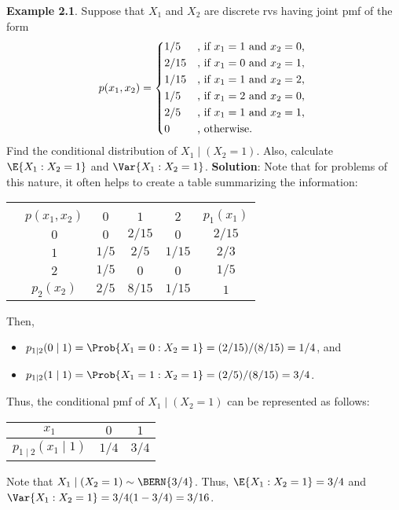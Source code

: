 \begin{Example}
    \textbf{Example 2.1}. Suppose that $ X_1 $ and $ X_2 $ are discrete rvs having joint pmf of the form
    \[ p(x_1,x_2)=\begin{cases*}
            1/5  & , if $ x_1=1 $ and $ x_2=0 $, \\
            2/15 & , if $ x_1=0 $ and $ x_2=1 $, \\
            1/15 & , if $ x_1=1 $ and $ x_2=2 $, \\
            1/5  & , if $ x_1=2 $ and $ x_2=0 $, \\
            2/5  & , if $ x_1=1 $ and $ x_2=1 $, \\
            0    & , otherwise.
        \end{cases*} \]
    Find the conditional distribution of $ X_1\mid (X_2=1) $. Also, calculate $ \E{X_1\given X_2=1} $ and
    $ \Var{X_1\given X_2=1} $.
    \tcblower{}
    \textbf{Solution}: Note that for problems of this nature, it often helps to create a table summarizing the information:
    \begin{center}
        \begin{NiceTabular}{cc|ccc|c}
                                 &                                                 \\%
                                 & $ p(x_1,x_2) $       & $ 0 $   & $ 1 $    & $ 2 $    & $ p_1(x_1) $ \\
             & $ 0 $                & $ 0 $   & $ 2/15 $ & $ 0 $    & $ 2/15 $     \\%
                                 & $ 1 $                & $ 1/5 $ & $ 2/5 $  & $ 1/15 $ & $ 2/3 $      \\
                                 & $ 2 $                & $ 1/5 $ & $ 0 $    & $ 0 $    & $ 1/5 $      \\
                                 & $ p_2(x_2) $         & $ 2/5 $ & $ 8/15 $ & $ 1/15 $ & $ 1 $
        \end{NiceTabular}
    \end{center}
    Then,
    \begin{itemize}
        \item $ p_{1\mid 2}(0\mid 1)=\Prob{X_1=0\given X_2=1}=(2/15)/(8/15)=1/4 $, and
        \item $ p_{1\mid 2}(1\mid 1)=\Prob{X_1=1\given X_2=1}=(2/5)/(8/15)=3/4 $.
    \end{itemize}
    Thus, the conditional pmf of $ X_1\mid(X_2=1) $ can be
    represented as follows:
    \begin{center}
        \begin{NiceTabular}{c|cc}
            $ x_1 $                    & $ 0 $   & $ 1 $   \\
            \midrule
            $ p_{1\mid 2}(x_1\mid 1) $ & $ 1/4 $ & $ 3/4 $
        \end{NiceTabular}
    \end{center}
    Note that $ X_1\mid (X_2=1)\sim \BERN{3/4} $. Thus, $ \E{X_1\given X_2=1}=3/4 $ and $ \Var{X_1\given X_2=1}=3/4(1-3/4)=3/16 $.
\end{Example}
